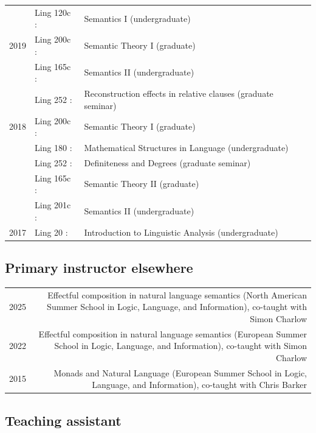 \documentclass[12pt]{article}
\begin{document}
\begin{longtable}{L@{}>{\lfstyle}p{0.11\textwidth}<{:}@{}p{0.78\textwidth}@{}}
       & Ling 120c & Semantics I (undergraduate)
  \\[1ex]
  2019 & Ling 200c & Semantic Theory I (graduate)\\
       & Ling 165c & Semantics II (undergraduate)\\
       & Ling 252  & Reconstruction effects in relative clauses (graduate seminar)
  \\[1ex]
  2018 & Ling 200c & Semantic Theory I (graduate)\\
       & Ling 180  & Mathematical Structures in Language (undergraduate)\\
       & Ling 252  & Definiteness and Degrees (graduate seminar)\\
       & Ling 165c & Semantic Theory II (graduate)\\
       & Ling 201c & Semantics II (undergraduate)
  \\[1ex]
  2017 & Ling 20   & Introduction to Linguistic Analysis (undergraduate)
\end{longtable}
\endgroup

\subsection*{Primary instructor elsewhere}%

\begin{longtable}{LR}
  2025 & Effectful composition in natural language semantics (North American
         Summer School in Logic, Language, and Information), co-taught with
         Simon Charlow\\

  2022 & Effectful composition in natural language semantics (European Summer
         School in Logic, Language, and Information), co-taught with Simon
         Charlow\\
  2015 & Monads and Natural Language (European Summer School in Logic, Language,
         and Information), co-taught with Chris Barker
\end{longtable}

\subsection*{Teaching assistant}
\end{document}
